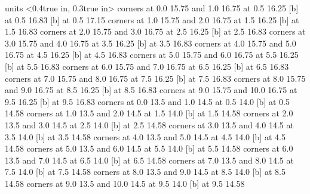 \beginpicture
\setcoordinatesystem units <0.4true in, 0.3true in>
\putrectangle corners at 0.0 15.75 and 1.0 16.75
 at 0.5 16.25
 [b] at 0.5 16.83
 [b] at 0.5 17.15
\putrectangle corners at 1.0 15.75 and 2.0 16.75
 at 1.5 16.25
 [b] at 1.5 16.83
\putrectangle corners at 2.0 15.75 and 3.0 16.75
 at 2.5 16.25
 [b] at 2.5 16.83
\putrectangle corners at 3.0 15.75 and 4.0 16.75
 at 3.5 16.25
 [b] at 3.5 16.83
\putrectangle corners at 4.0 15.75 and 5.0 16.75
 at 4.5 16.25
 [b] at 4.5 16.83
\putrectangle corners at 5.0 15.75 and 6.0 16.75
 at 5.5 16.25
 [b] at 5.5 16.83
\putrectangle corners at 6.0 15.75 and 7.0 16.75
 at 6.5 16.25
 [b] at 6.5 16.83
\putrectangle corners at 7.0 15.75 and 8.0 16.75
 at 7.5 16.25
 [b] at 7.5 16.83
\putrectangle corners at 8.0 15.75 and 9.0 16.75
 at 8.5 16.25
 [b] at 8.5 16.83
\putrectangle corners at 9.0 15.75 and 10.0 16.75
 at 9.5 16.25
 [b] at 9.5 16.83
\putrectangle corners at 0.0 13.5 and 1.0 14.5
 at 0.5 14.0
 [b] at 0.5 14.58
\putrectangle corners at 1.0 13.5 and 2.0 14.5
 at 1.5 14.0
 [b] at 1.5 14.58
\putrectangle corners at 2.0 13.5 and 3.0 14.5
 at 2.5 14.0
 [b] at 2.5 14.58
\putrectangle corners at 3.0 13.5 and 4.0 14.5
 at 3.5 14.0
 [b] at 3.5 14.58
\putrectangle corners at 4.0 13.5 and 5.0 14.5
 at 4.5 14.0
 [b] at 4.5 14.58
\putrectangle corners at 5.0 13.5 and 6.0 14.5
 at 5.5 14.0
 [b] at 5.5 14.58
\putrectangle corners at 6.0 13.5 and 7.0 14.5
 at 6.5 14.0
 [b] at 6.5 14.58
\putrectangle corners at 7.0 13.5 and 8.0 14.5
 at 7.5 14.0
 [b] at 7.5 14.58
\putrectangle corners at 8.0 13.5 and 9.0 14.5
 at 8.5 14.0
 [b] at 8.5 14.58
\putrectangle corners at 9.0 13.5 and 10.0 14.5
 at 9.5 14.0
 [b] at 9.5 14.58
